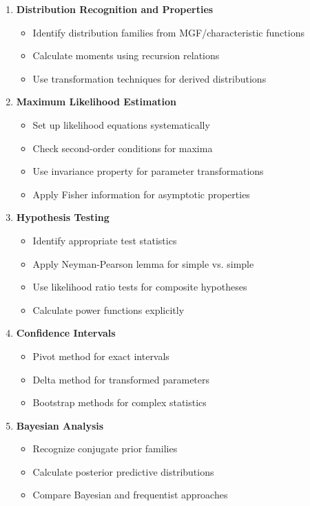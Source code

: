 \documentclass[12pt,a4paper]{article}
\theoremstyle{remark}
\begin{document}
\begin{enumerate}
\item \textbf{Distribution Recognition and Properties}
   \begin{itemize}
   \item Identify distribution families from MGF/characteristic functions
   \item Calculate moments using recursion relations
   \item Use transformation techniques for derived distributions
   \end{itemize}

\item \textbf{Maximum Likelihood Estimation}
   \begin{itemize}
   \item Set up likelihood equations systematically
   \item Check second-order conditions for maxima
   \item Use invariance property for parameter transformations
   \item Apply Fisher information for asymptotic properties
   \end{itemize}

\item \textbf{Hypothesis Testing}
   \begin{itemize}
   \item Identify appropriate test statistics
   \item Apply Neyman-Pearson lemma for simple vs. simple
   \item Use likelihood ratio tests for composite hypotheses
   \item Calculate power functions explicitly
   \end{itemize}

\item \textbf{Confidence Intervals}
   \begin{itemize}
   \item Pivot method for exact intervals
   \item Delta method for transformed parameters
   \item Bootstrap methods for complex statistics
   \end{itemize}

\item \textbf{Bayesian Analysis}
   \begin{itemize}
   \item Recognize conjugate prior families
   \item Calculate posterior predictive distributions
   \item Compare Bayesian and frequentist approaches
   \end{itemize}


\end{enumerate}
\end{document}
